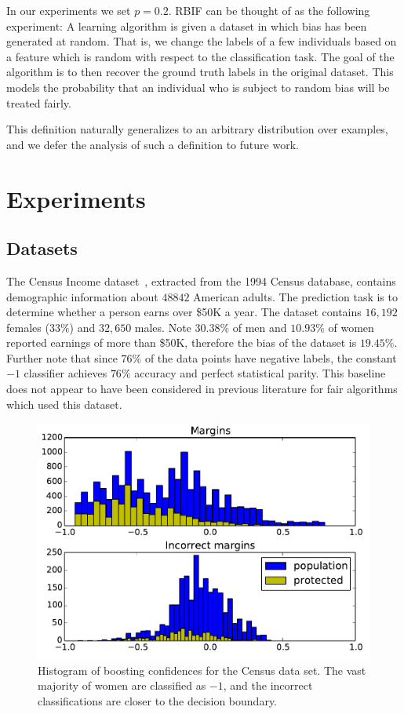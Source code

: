 \documentclass[conference]{IEEEtran}
\begin{document}
In our experiments we set $p = 0.2$.  RBIF can be thought of as the following
experiment:  A learning algorithm is given a dataset in which bias has been
generated at random.  That is, we change the labels of a few individuals based
on a feature which is random with respect to the classification task.  The goal
of the algorithm is to then recover the ground truth labels in the original
dataset.  This models the probability that an individual who is subject to
random bias will be treated fairly.

This definition naturally generalizes to an arbitrary distribution over
examples, and we defer the analysis of such a definition to future work. 

\section{Experiments} \label{sec:experiments}

\subsection{Datasets}

The Census Income dataset~\cite{Lichman13}, extracted from the 1994 Census
database, contains demographic information about $48842$ American adults.  The
prediction task is to determine whether a person earns over \$50K a year.  The
dataset contains $16,192$ females ($33\%$) and $32,650$ males. Note $30.38\%$
of men and $10.93\%$ of women reported earnings of more than \$50K, therefore
the bias of the dataset is $19.45\%$. Further note that since $76\%$ of the
data points have negative labels, the constant $-1$ classifier achieves $76\%$
accuracy and perfect statistical parity. This baseline does not appear to have
been considered in previous literature for fair algorithms which used this
dataset.

\begin{figure}[t]
\centering
\includegraphics[width=\columnwidth]{images/censusmargins.pdf}
\caption{Histogram of boosting confidences for the Census data set. The vast
majority of women are classified as $-1$, and the incorrect classifications are
closer to the decision boundary.}
\label{fig:boosting-margins}
\end{figure}
\end{document}
